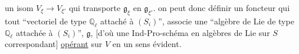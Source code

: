 un isom $V_\xi\longrightarrow V_{\xi'}$ qui transporte $\mathfrak g_\xi$ en $\mathfrak g_{\xi'}$.  on peut donc définir \unsure{---} un foncteur  qui  tout ``vectoriel de type $\mathbb Q_\ell$ attaché à $(S_i)$'',  associe une ``algèbre de Lie de type $\mathbb Q_\ell$ attachée à $(S_i)$'',  $\mathfrak g$,  [d'où une Ind-Pro-schéma en algèbres de Lie sur $S$ correspondant] \uline{opérant} sur $V$ en un sens évident.

